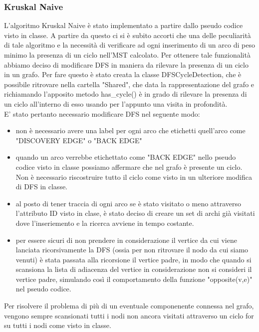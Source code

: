 \subsubsection{Kruskal Naive}
L'algoritmo Kruskal Naive è stato implementato a partire dallo pseudo codice visto in classe. A partire da questo ci si è subito accorti che una delle peculiarità di tale algoritmo e la necessità di verificare ad ogni inserimento di un arco di peso minimo la presenza di un ciclo nell'MST calcolato. Per ottenere tale funzionalità abbiamo deciso di modificare DFS in maniera da rilevare la presenza di un ciclo in un grafo. Per fare questo è stato creata la classe DFSCycleDetection, che è possibile ritrovare nella cartella "Shared", che data la rappresentazione del grafo e richiamando l'apposito metodo has\_cycle() è in grado di rilevare la presenza di un ciclo all'interno di esso usando per l'appunto una visita in profondità.\\

E' stato pertanto necessario modificare DFS nel seguente modo:
\begin{itemize}
	\item non è necessario avere una label per ogni arco che etichetti quell'arco come "DISCOVERY EDGE" o "BACK EDGE"
	\item quando un arco verrebbe etichettato come "BACK EDGE" nello pseudo codice visto in classe possiamo affermare che nel grafo è presente un ciclo. Non è necessario riscostruire tutto il ciclo come visto in un ulteriore modifica di DFS in classe.
	\item al posto di tener traccia di ogni arco se è stato visitato o meno attraverso l'attributo ID visto in clase, è stato deciso di creare un set di archi già visitati dove l'inseriemento e la ricerca avviene in tempo costante.
	\item per essere sicuri di non prendere in considerazione il vertice da cui viene lanciata ricorsivamente la DFS (ossia per non ritrovare il nodo da cui siamo venuti) è stata passata alla ricorsione il vertice padre, in modo che quando si scansiona la lista di adiacenza del vertice in considerazione non si consideri il vertice padre, simulando così il comportamento della funzione "opposite(v,e)" nel pseudo codice.
\end{itemize}

Per risolvere il problema di più di un eventuale componenente connessa nel grafo, vengono sempre scansionati tutti i nodi non ancora visitati attraverso un ciclo for su tutti i nodi come visto in classe.


